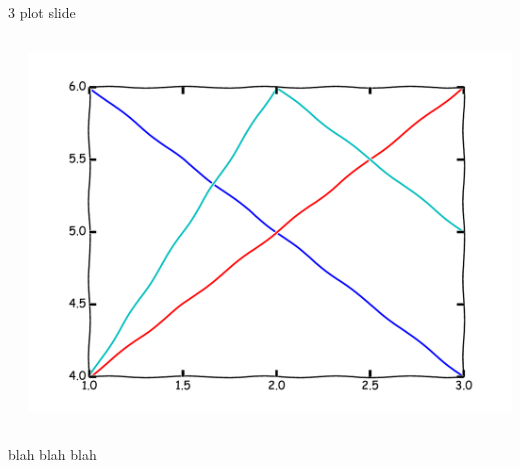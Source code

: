 \begin{frame}{3 plot slide}
\begin{columns}
\begin{column}{0.33\textwidth}
\begin{center}
\\
\end{center}
\end{column}
\begin{column}{0.33\textwidth}
\begin{center}
\includegraphics[width=\textwidth]{example/plot4.pdf}
\\
\end{center}
\end{column}
\end{columns}
blah blah blah
\end{frame}

